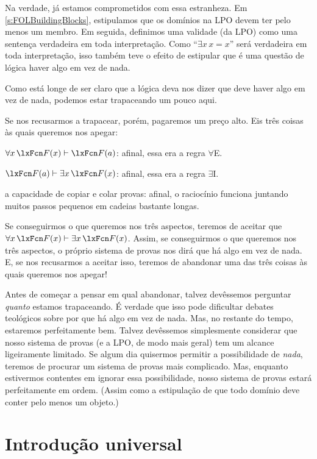 Na verdade, já estamos comprometidos com essa estranheza. Em \cref{s:FOLBuildingBlocks}, estipulamos que os domínios na LPO devem ter pelo menos um membro. Em seguida, definimos uma validade (da LPO) como uma sentença verdadeira em toda interpretação. Como \textquotedblleft $\exists x\,x=x$\textquotedblright{} será verdadeira em toda interpretação, isso também teve o efeito de estipular que é uma questão de lógica haver algo em vez de nada.

Como está longe de ser claro que a lógica deva nos dizer que deve haver algo em vez de nada, podemos estar trapaceando um pouco aqui.

Se nos recusarmos a trapacear, porém, pagaremos um preço alto. Eis três coisas às quais queremos nos apegar:
	\begin{compactlist}
\item $\forall x\,\atom{F}{x} \proves \atom{F}{a}$: afinal, essa era a regra $\forall$E.
\item $\atom{F}{a} \proves \exists x\,\atom{F}{x}$: afinal, essa era a regra $\exists$I.
\item a capacidade de copiar e colar provas: afinal, o raciocínio funciona juntando muitos passos pequenos em cadeias bastante longas.
	\end{compactlist}
Se conseguirmos o que queremos nos três aspectos, teremos de aceitar que $\forall x\,\atom{F}{x} \proves \exists x\,\atom{F}{x}$. Assim, se conseguirmos o que queremos nos três aspectos, o próprio sistema de provas nos dirá que há algo em vez de nada. E, se nos recusarmos a aceitar isso, teremos de abandonar uma das três coisas às quais queremos nos apegar!

Antes de começar a pensar em qual abandonar, talvez devêssemos perguntar \emph{quanto} estamos trapaceando. É verdade que isso pode dificultar debates teológicos sobre por que há algo em vez de nada. Mas, no restante do tempo, estaremos perfeitamente bem. Talvez devêssemos simplesmente considerar que nosso sistema de provas (e a LPO, de modo mais geral) tem um alcance ligeiramente limitado. Se algum dia quisermos permitir a possibilidade de \emph{nada}, teremos de procurar um sistema de provas mais complicado. Mas, enquanto estivermos contentes em ignorar essa possibilidade, nosso sistema de provas estará perfeitamente em ordem. (Assim como a estipulação de que todo domínio deve conter pelo menos um objeto.)

\section{Introdução universal}\label{s:forallIntro}

